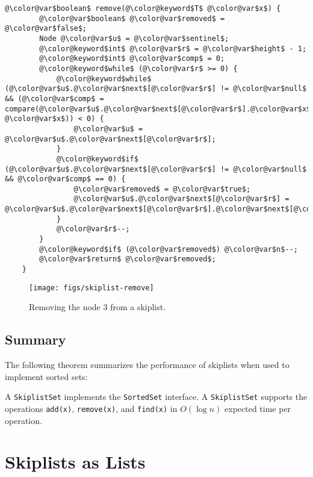 \begin{Verbatim}[tabsize=2,frame=single,commandchars=\\@\$,label=\texttt{SkiplistSet},labelposition=topline]
	@\color@var$boolean$ remove(@\color@keyword$T$ @\color@var$x$) {
		@\color@var$boolean$ @\color@var$removed$ = @\color@var$false$;
		Node @\color@var$u$ = @\color@var$sentinel$;
		@\color@keyword$int$ @\color@var$r$ = @\color@var$height$ - 1;
		@\color@keyword$int$ @\color@var$comp$ = 0;
		@\color@keyword$while$ (@\color@var$r$ >= 0) {
			@\color@keyword$while$ (@\color@var$u$.@\color@var$next$[@\color@var$r$] != @\color@var$null$ && (@\color@var$comp$ = compare(@\color@var$u$.@\color@var$next$[@\color@var$r$].@\color@var$x$, @\color@var$x$)) < 0) {
				@\color@var$u$ = @\color@var$u$.@\color@var$next$[@\color@var$r$];
			}
			@\color@keyword$if$ (@\color@var$u$.@\color@var$next$[@\color@var$r$] != @\color@var$null$ && @\color@var$comp$ == 0) {
				@\color@var$removed$ = @\color@var$true$;
				@\color@var$u$.@\color@var$next$[@\color@var$r$] = @\color@var$u$.@\color@var$next$[@\color@var$r$].@\color@var$next$[@\color@var$r$];
			}
			@\color@var$r$--;
		}
		@\color@keyword$if$ (@\color@var$removed$) @\color@var$n$--;
		@\color@var$return$ @\color@var$removed$;
	}
\end{Verbatim}

\begin{figure}
  \begin{center}
    \texttt{[image: figs/skiplist-remove]}
  \end{center}
  \caption{Removing the node 3 from a skiplist.}
\end{figure}

\subsection{Summary}

The following theorem summarizes the performance of skiplists when used to
implement sorted sets:

\begin{thm}
A \mbox{\texttt{SkiplistSet}} implements the \mbox{\texttt{SortedSet}} interface. A \mbox{\texttt{SkiplistSet}} supports
the operations \mbox{\texttt{add({\color{var}x})}}, \mbox{\texttt{remove({\color{var}x})}}, and \mbox{\texttt{find({\color{var}x})}} in $O(\log n)$
expected time per operation.
\end{thm}

\section{Skiplists as Lists}

